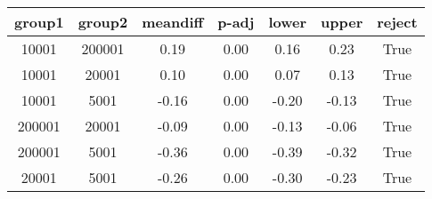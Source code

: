 \begin{tabular}{|c|c|c|c|c|c|c|}
\toprule
 group1 &  group2 &  meandiff &  p-adj &  lower &  upper &  reject \\
\midrule
  10001 &  200001 &      0.19 &   0.00 &   0.16 &   0.23 &    True \\
  10001 &   20001 &      0.10 &   0.00 &   0.07 &   0.13 &    True \\
  10001 &    5001 &     -0.16 &   0.00 &  -0.20 &  -0.13 &    True \\
 200001 &   20001 &     -0.09 &   0.00 &  -0.13 &  -0.06 &    True \\
 200001 &    5001 &     -0.36 &   0.00 &  -0.39 &  -0.32 &    True \\
  20001 &    5001 &     -0.26 &   0.00 &  -0.30 &  -0.23 &    True \\
\bottomrule
\end{tabular}
